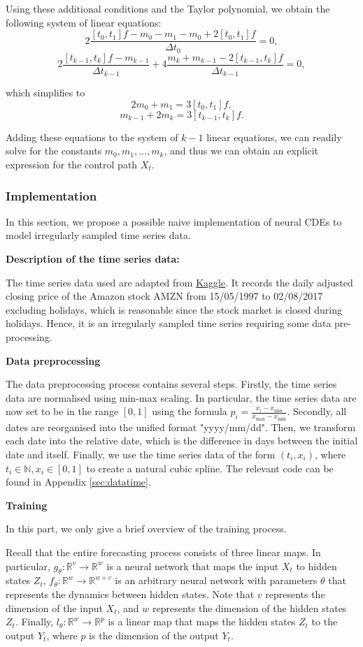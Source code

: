 \documentclass[a4paper,11pt,titlepage]{article}
\theoremstyle{definition}
\theoremstyle{plain}
\theoremstyle{remark}
\begin{document}
Using these additional conditions and the Taylor polynomial, we obtain the following system of linear equations:
$$2\frac{[t_0,t_1]f-m_0-m_1-m_0+2[t_0,t_1]f}{\Delta t_0}=0,$$
$$2\frac{[t_{k-1},t_k]f-m_{k-1}}{\Delta t_{k-1}}+4\frac{m_k+m_{k-1}-2[t_{k-1},t_k]f}{\Delta t_{k-1}}=0,$$

which simplifies to
$$2m_0+m_1=3[t_0,t_1]f,$$
$$m_{k-1}+2m_k=3[t_{k-1},t_k]f.$$

Adding these equations to the system of $k-1$ linear equations, we can readily solve for the constants $m_0,m_1,\dots,m_k$, and thus we can obtain an explicit expression for the control path $X_t$. 

\subsubsection{Implementation}
\label{sec:implementation}

In this section, we propose a possible naive implementation of neural CDEs to model irregularly sampled time series data.

\textbf{Description of the time series data:}

The time series data used are adapted from \href{https://www.kaggle.com/datasets/praxitelisk/financial-time-series-datasets}{Kaggle}. It records the daily adjusted closing price of the Amazon stock AMZN from 15/05/1997 to 02/08/2017 excluding holidays, which is reasonable since the stock market is closed during holidays. Hence, it is an irregularly sampled time series requiring some data pre-processing.

\textbf{Data preprocessing}

The data preprocessing process contains several steps. Firstly, the time series data are normalised using min-max scaling. In particular, the time series data are now set to be in the range $[0,1]$ using the formula $p_i=\frac{x_i-x_{\min}}{x_{\max}-x_{\min}}$. Secondly, all dates are reorganised into the unified format "yyyy/mm/dd". Then, we transform each date into the relative date, which is the difference in days between the initial date and itself. Finally, we use the time series data of the form $(t_i,x_i)$, where $t_i\in\mathbb{N}, x_i\in[0,1]$ to create a natural cubic spline. The relevant code can be found in Appendix \ref{sec:datatime}.

\textbf{Training}

In this part, we only give a brief overview of the training process.

Recall that the entire forecasting process consists of three linear maps. In particular, $g_\theta:\mathbb{R}^v\rightarrow\mathbb{R}^w$ is a neural network that maps the input $X_t$ to hidden states $Z_t$, $f_\theta:\mathbb{R}^w\rightarrow\mathbb{R}^{w\times v}$ is an arbitrary neural network with parameters $\theta$ that represents the dynamics between hidden states. Note that $v$ represents the dimension of the input $X_t$, and $w$ represents the dimension of the hidden states $Z_t$. Finally, $l_\theta:\mathbb{R}^w\rightarrow\mathbb{R}^p$ is a linear map that maps the hidden states $Z_t$ to the output $Y_t$, where $p$ is the dimension of the output $Y_t$.
\end{document}
